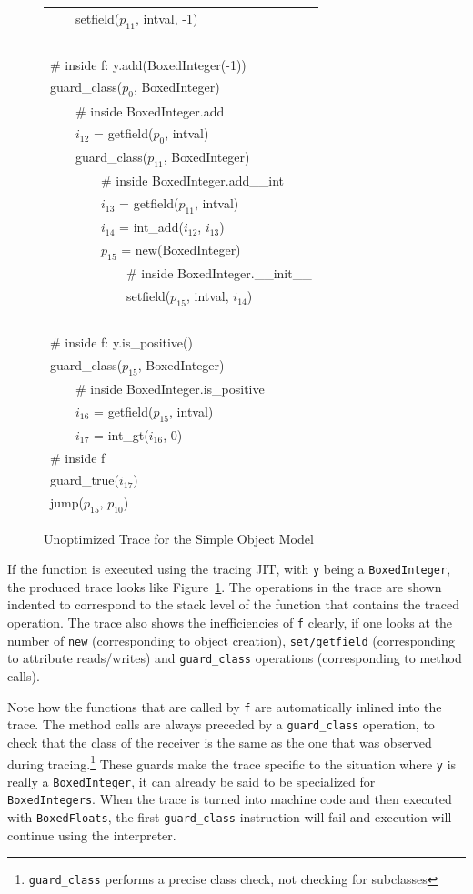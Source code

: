 \documentclass{sigplanconf}
\begin{document}
\begin{figure}
{\begin{tabular}{l}
~~~~setfield($p_{11}$, intval, -1) \\
~\\
\# inside f: y.add(BoxedInteger(-1)) \\
guard\_class($p_{0}$, BoxedInteger) \\
~~~~\# inside BoxedInteger.add \\
~~~~$i_{12}$ = getfield($p_{0}$, intval) \\
~~~~guard\_class($p_{11}$, BoxedInteger) \\
~~~~~~~~\# inside BoxedInteger.add\_\_int \\
~~~~~~~~$i_{13}$ = getfield($p_{11}$, intval) \\
~~~~~~~~$i_{14}$ = int\_add($i_{12}$, $i_{13}$) \\
~~~~~~~~$p_{15}$ = new(BoxedInteger) \\
~~~~~~~~~~~~\# inside BoxedInteger.\_\_init\_\_ \\
~~~~~~~~~~~~setfield($p_{15}$, intval, $i_{14}$) \\
~\\
\# inside f: y.is\_positive() \\
guard\_class($p_{15}$, BoxedInteger) \\
~~~~\# inside BoxedInteger.is\_positive \\
~~~~$i_{16}$ = getfield($p_{15}$, intval) \\
~~~~$i_{17}$ = int\_gt($i_{16}$, 0) \\
\# inside f \\
guard\_true($i_{17}$) \\
jump($p_{15}$, $p_{10}$) \\
\end{tabular}
}
\label{fig:unopt-trace}
\caption{Unoptimized Trace for the Simple Object Model}
\end{figure}

If the function is executed using the tracing JIT, with \texttt{y} being a
\texttt{BoxedInteger}, the produced trace looks like
Figure~\ref{fig:unopt-trace}. The operations in the trace are shown indented to
correspond to the stack level of the function that contains the traced
operation. The trace also shows the inefficiencies of \texttt{f} clearly, if one
looks at the number of \texttt{new} (corresponding to object creation),
\texttt{set/getfield} (corresponding to attribute reads/writes) and
\texttt{guard\_class} operations (corresponding to method calls).

Note how the functions that are called by \texttt{f} are automatically inlined
into the trace. The method calls are always preceded by a \texttt{guard\_class}
operation, to check that the class of the receiver is the same as the one that
was observed during tracing.\footnote{\texttt{guard\_class} performs a precise
class check, not checking for subclasses} These guards make the trace specific
to the situation where \texttt{y} is really a \texttt{BoxedInteger}, it can
already be said to be specialized for \texttt{BoxedIntegers}. When the trace is
turned into machine code and then executed with \texttt{BoxedFloats}, the
first \texttt{guard\_class} instruction will fail and execution will continue
using the interpreter.
\end{document}

